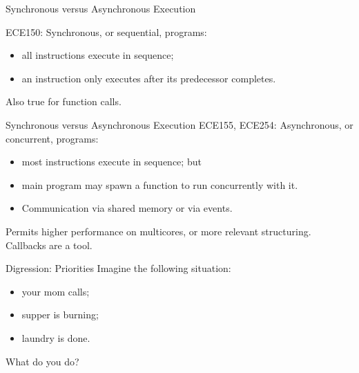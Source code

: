 \documentclass[aspectratio=169]{beamer}
\begin{document}
\begin{frame}{Synchronous versus Asynchronous Execution}

ECE150: Synchronous, or sequential, programs:
\begin{itemize}
\item all instructions execute in sequence;
\item an instruction only executes after its predecessor completes.
\end{itemize}
Also true for function calls.\\[1em]
\end{frame}



\begin{frame}{Synchronous versus Asynchronous Execution}
ECE155, ECE254: Asynchronous, or concurrent, programs:
\begin{itemize}
\item most instructions execute in sequence; but
\item main program may spawn a function to run concurrently with it.
\item Communication via shared memory or via events.
\end{itemize}
Permits higher performance on multicores, or more relevant structuring.
Callbacks are a tool.
\end{frame}


\begin{frame}{Digression: Priorities}
Imagine the following situation:
\begin{itemize}
\item your mom calls;
\item supper is burning;
\item laundry is done.
\end{itemize}
What do you do?
\end{frame}
\end{document}
